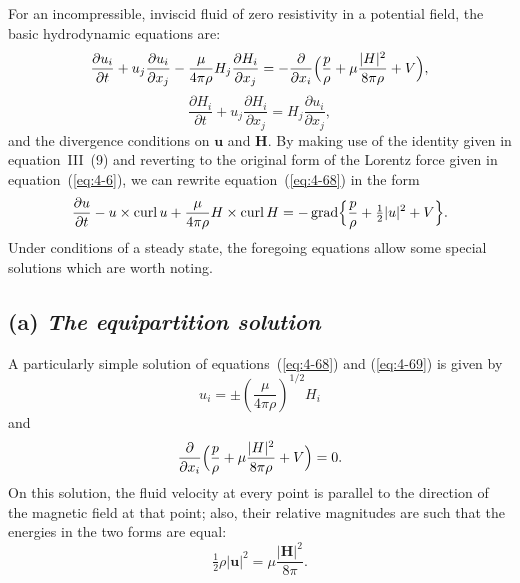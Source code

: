 For an incompressible, inviscid fluid of zero resistivity in a potential field, the basic hydrodynamic equations are:
\begin{equation}
\label{eq:4-68}
\frac{\partial u_i}{\partial t}+u_j\frac{\partial u_i}{\partial x_j}-\frac{\mu}{4\pi\rho}H_j\frac{\partial H_i}{\partial x_j} = -\frac{\partial}{\partial x_i}\Bigl(\frac{p}{\rho}+\mu\frac{|\mathbf{H}|^2}{8\pi\rho}+V\Bigr),
\end{equation}
\begin{equation}
\label{eq:4-69}
\frac{\partial H_i}{\partial t}+u_j\frac{\partial H_i}{\partial x_j} = H_j\frac{\partial u_i}{\partial x_j},
\end{equation}
and the divergence conditions on $\mathbf{u}$ and $\mathbf{H}$. By making use of the identity given in equation~III~(9) and reverting to the original form of the Lorentz force given in equation~(\ref{eq:4-6}), we can rewrite equation~(\ref{eq:4-68}) in the form
\begin{equation}
\label{eq:4-70}
\frac{\partial\mathbf{u}}{\partial t}-\mathbf{u}\times\operatorname{curl}\mathbf{u}+\frac{\mu}{4\pi\rho}\mathbf{H}\times\operatorname{curl}\mathbf{H} = -\operatorname{grad}\Bigl\{\frac{p}{\rho}+\tfrac{1}{2}|\mathbf{u}|^2+V\Bigr\}.
\end{equation}
Under conditions of a steady state, the foregoing equations allow some special solutions which are worth noting.

\subsection*{(a) \emph{The equipartition solution}}

A particularly simple solution of equations~(\ref{eq:4-68}) and (\ref{eq:4-69}) is given by
\begin{equation}
\label{eq:4-71}
u_i = \pm\left(\frac{\mu}{4\pi\rho}\right)^{\!1/2}\!H_i
\end{equation}
and
\begin{equation}
\label{eq:4-72}
\frac{\partial}{\partial x_i}\Bigl(\frac{p}{\rho}+\mu\frac{|\mathbf{H}|^2}{8\pi\rho}+V\Bigr) = 0.
\end{equation}
On this solution, the fluid velocity at every point is parallel to the direction of the magnetic field at that point; also, their relative magnitudes are such that the energies in the two forms are equal:
\begin{equation}
\label{eq:4-73}
\tfrac{1}{2}\rho|\mathbf{u}|^2 = \mu\frac{|\mathbf{H}|^2}{8\pi}.
\end{equation}

